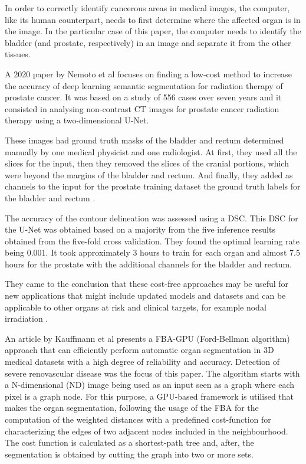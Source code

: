 \documentclass[runningheads,a4paper,11pt]{report}
\begin{document}
In order to correctly identify cancerous areas in medical images, the computer, like its human counterpart, needs to first determine where the affected organ is in the image. In the particular case of this paper, the computer needs to identify the bladder (and prostate, respectively) in an image and separate it from the other tissues.

A 2020 paper by Nemoto et al \cite{nemoto2020simple} focuses on finding a low-cost method to increase the accuracy of deep learning semantic segmentation for radiation therapy of prostate cancer. It was based on a study of 556 cases over seven years and it consisted in analysing non-contrast CT images for prostate cancer radiation therapy using a two-dimensional U-Net. 

These images had ground truth masks of the bladder and rectum determined manually by one medical physicist and one radiologist. At first, they used all the slices for the input, then they removed the slices of the cranial portions, which were beyond the margins of the bladder and rectum. And finally, they added as channels to the input for the prostate training dataset the ground truth labels for the bladder and rectum \cite{nemoto2020simple}.

The accuracy of the contour delineation was assessed using a DSC. This DSC for the U-Net was obtained based on a majority from the five inference results obtained from the five-fold cross validation. They found the optimal learning rate being 0.001. \cite{nemoto2020simple} It took approximately 3 hours to train for each organ and almost 7.5 hours for the prostate with the additional channels for the bladder and rectum. 

They came to the conclusion that these cost-free approaches may be useful for new applications that might include updated models and datasets and can be applicable to other organs at risk and clinical targets, for example nodal irradiation \cite{nemoto2020simple}.

An article by Kauffmann et al \cite{kauffmann2010seeded} presents a FBA-GPU (Ford-Bellman algorithm) approach that can efficiently perform automatic organ segmentation in 3D medical datasets with a high degree of reliability and accuracy. Detection of severe renovascular disease was the focus of this paper. The algorithm starts with a N-dimensional (ND) image being used as an input seen as a graph where each pixel is a graph node. For this purpose, a GPU-based framework is utilised that makes the organ segmentation, following the usage of the FBA for the computation of the weighted distances with a predefined cost-function for characterizing the edges of two adjacent nodes included in the neighbourhood. The cost function is calculated as a shortest-path tree and, after, the segmentation is obtained by cutting the graph into two or more sets.  
 
\end{document}
